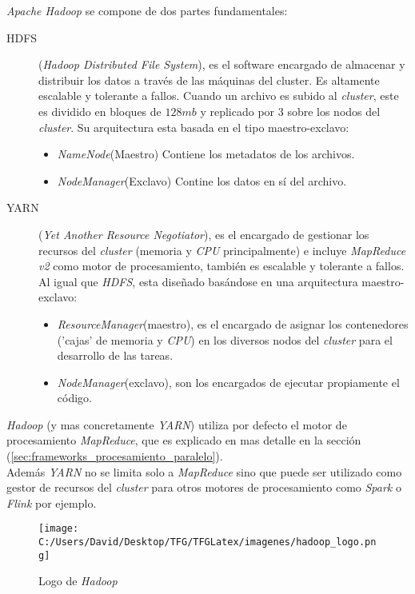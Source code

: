 \noindent \textit{Apache Hadoop} se compone de dos partes fundamentales:
\begin{description}
  \item[HDFS](\textit{Hadoop Distributed File System}), es el software encargado de almacenar 
  y distribuir los datos a través de las máquinas del cluster. Es altamente escalable y tolerante a fallos.
  Cuando un archivo es subido al \textit{cluster}, este es dividido en bloques de $128 mb$ y replicado por
  3 sobre los nodos del \textit{cluster}.
  Su arquitectura esta basada en el tipo maestro-exclavo:
  \begin{itemize}
    \item \textit{NameNode}(Maestro) Contiene los metadatos de los archivos.
    \item \textit{NodeManager}(Exclavo) Contine los datos en sí del archivo.
  \end{itemize}

  \item[YARN] (\textit{Yet Another Resource Negotiator}), es el encargado de gestionar 
  los recursos del \textit{cluster} (memoria y \textit{CPU} principalmente) e incluye \textit{MapReduce v2} 
  como motor de procesamiento, también es escalable y tolerante a fallos.
  Al igual que \textit{HDFS}, esta diseñado basándose en una arquitectura maestro-exclavo:
  \begin{itemize}
    \item \textit{ResourceManager}(maestro), es el encargado de asignar los contenedores ('cajas' de
    memoria y \textit{CPU}) en los diversos nodos del \textit{cluster} para el desarrollo de las tareas.
    \item \textit{NodeManager}(exclavo), son los encargados de ejecutar propiamente el código.
  \end{itemize}
\end{description}

\noindent \textit{Hadoop} (y mas concretamente \textit{YARN}) utiliza por defecto el motor de procesamiento \textit{MapReduce},
que es explicado en mas detalle en la sección  
  (\autoref{sec:frameworks_procesamiento_paralelo}). \\
Además \textit{YARN} no se limita solo a \textit{MapReduce} sino que puede ser utilizado como gestor de recursos
del \textit{cluster} para otros motores de procesamiento como \textit{Spark} o \textit{Flink} por ejemplo.

\begin{figure}[!htpb]
  \centering
  \texttt{[image: C:/Users/David/Desktop/TFG/TFGLatex/imagenes/hadoop\_logo.png]}
  \caption[\textit{Hadoop} logo]{Logo de \textit{Hadoop}}
  \label{hadoop_logo}
\end{figure}

